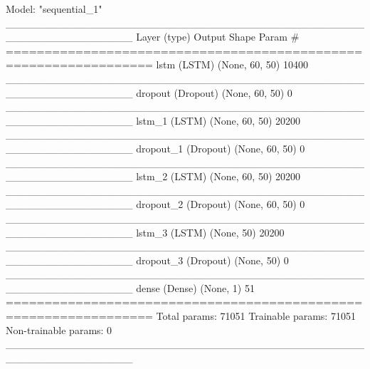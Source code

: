 
Model: "sequential_1"
_________________________________________________________________
Layer (type)                 Output Shape              Param #   
=================================================================
lstm (LSTM)                  (None, 60, 50)            10400     
_________________________________________________________________
dropout (Dropout)            (None, 60, 50)            0         
_________________________________________________________________
lstm_1 (LSTM)                (None, 60, 50)            20200     
_________________________________________________________________
dropout_1 (Dropout)          (None, 60, 50)            0         
_________________________________________________________________
lstm_2 (LSTM)                (None, 60, 50)            20200     
_________________________________________________________________
dropout_2 (Dropout)          (None, 60, 50)            0         
_________________________________________________________________
lstm_3 (LSTM)                (None, 50)                20200     
_________________________________________________________________
dropout_3 (Dropout)          (None, 50)                0         
_________________________________________________________________
dense (Dense)                (None, 1)                 51        
=================================================================
Total params: 71051
Trainable params: 71051
Non-trainable params: 0
_________________________________________________________________
